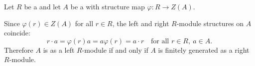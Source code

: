 \begin{proposition} \label{proposition:central_algebra_finitely_generated_left_iff_right}
    Let $R$ be a  and let $A$ be a  with structure map $\varphi: R \to Z(A)$.

    Since $\varphi(r) \in Z(A)$ for all $r \in R$, the left and right $R$-module structures on $A$ coincide:
    $$r \cdot a = \varphi(r)a = a\varphi(r) = a \cdot r \quad \text{for all } r \in R,\ a \in A.$$
    Therefore $A$ is  as a left $R$-module if and only if $A$ is finitely generated as a right $R$-module.
\end{proposition}
